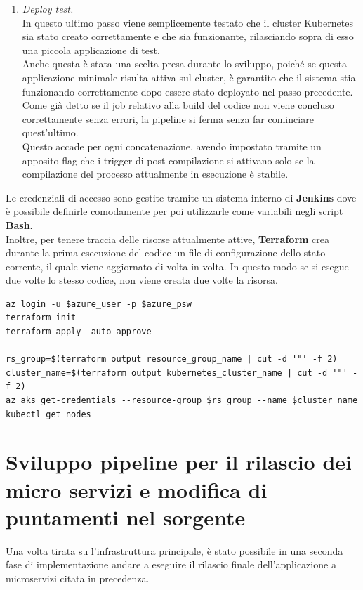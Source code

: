 \documentclass[a4paper,12pt]{report}
\begin{document}
\begin{enumerate}
\item \textit{Deploy test.} \\
In questo ultimo passo viene semplicemente testato che il cluster Kubernetes sia stato creato correttamente e che sia funzionante, rilasciando sopra di esso una piccola applicazione di test.\\
Anche questa è stata una scelta presa durante lo sviluppo, poiché se questa applicazione minimale risulta attiva sul cluster, è garantito che il sistema stia funzionando correttamente dopo essere stato deployato nel passo precedente.
Come già detto se il job relativo alla build del codice non viene concluso correttamente senza errori, la pipeline si ferma senza far cominciare quest'ultimo.\\
Questo accade per ogni concatenazione, avendo impostato tramite un apposito flag che i trigger di post-compilazione si attivano solo se la compilazione del processo attualmente in esecuzione è stabile.\\
\end{enumerate}

Le credenziali di accesso sono gestite tramite un sistema interno di \textbf{Jenkins} dove è possibile definirle comodamente per poi utilizzarle come variabili negli script \textbf{Bash}.\\
Inoltre, per tenere traccia delle risorse attualmente attive, \textbf{Terraform} crea durante la prima esecuzione del codice un file di configurazione dello stato corrente, il quale viene aggiornato di volta in volta. In questo modo se si esegue due volte lo stesso codice, non viene creata due volte la risorsa.

\begin{lstlisting}[caption={\\\textit{Frammento di codice relativo alla compilazione del codice Terraform.\\ Nelle ultime righe viene effettuato un collegamento con il cluster appena creato e lanciato un comando per visualizzare i nodi in modo da accertarsi che sia operativo.}}]
az login -u $azure_user -p $azure_psw
terraform init
terraform apply -auto-approve 

rs_group=$(terraform output resource_group_name | cut -d '"' -f 2)
cluster_name=$(terraform output kubernetes_cluster_name | cut -d '"' -f 2)
az aks get-credentials --resource-group $rs_group --name $cluster_name
kubectl get nodes
\end{lstlisting}

\section{Sviluppo pipeline per il rilascio dei micro servizi e modifica di puntamenti nel sorgente}
Una volta tirata su l'infrastruttura principale, è stato possibile in una seconda fase di implementazione andare a eseguire il rilascio finale dell'applicazione a microservizi citata in precedenza.
\end{document}
